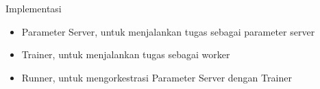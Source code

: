 \begin{frame}{Implementasi}
  \begin{itemize}
    \item Parameter Server, untuk menjalankan tugas sebagai parameter server
    \item Trainer, untuk menjalankan tugas sebagai worker
    \item Runner, untuk mengorkestrasi Parameter Server dengan Trainer
  \end{itemize}
\end{frame}
